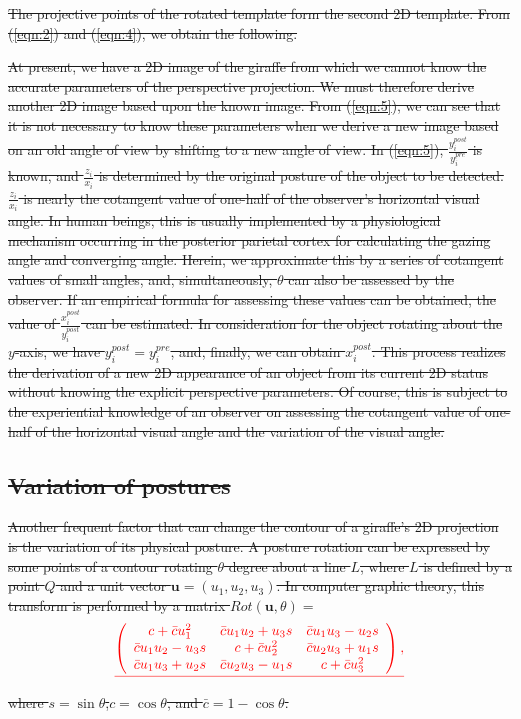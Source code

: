 \documentclass[journal]{IEEEtran}
\providecommand{\DIFdel}[1]{{\protect\color{red}\sout{#1}}}                      %
\begin{document}
\DIFdel{The projective points of the rotated template form the second 2D template.
From (\ref{eqn:2}) and (\ref{eqn:4}), we obtain the following.
}

\DIFdel{At present, 
we have a 2D image of the giraffe from which we cannot know the accurate parameters of the perspective projection. 
We must therefore derive another 2D image based upon the known image. 
From (\ref{eqn:5}), we can see that it is not necessary to know these parameters when we derive a new image based on an old angle of view by shifting to a new angle of view. 
In (\ref{eqn:5}), $\frac{y_i^{post}}{y_i^{pre}}$ is known,
and $\frac{z_i}{x_i}$ is determined by the original posture of the object to be detected. 
$\frac{z_i}{x_i}$ is nearly the cotangent value of one-half of the observer's horizontal visual angle. 
In human beings, this is usually implemented by a physiological mechanism occurring in the posterior parietal cortex for calculating the gazing angle and converging angle. 
Herein, we approximate this by a series of cotangent values of small angles, 
and, simultaneously, $\theta$ can also be assessed by the observer. 
If an empirical formula for assessing these values can be obtained, 
the value of $\frac{x_i^{post}}{y_i^{post}}$ can be estimated. 
In consideration for the object rotating about the $y$-axis, we have $y_i^{post}=y_i^{pre}$, 
and, finally, we can obtain $x_i^{post}$. 
This process realizes the derivation of a new 2D appearance of an object from its current 2D status without knowing the explicit perspective parameters. 
Of course, this is subject to the experiential knowledge of an observer on assessing the cotangent value of one-half of the horizontal visual angle and the variation of the visual angle.
}%

\subsection{\DIFdel{Variation of postures}}
\addtocounter{subsection}{-1}%

\DIFdel{Another frequent factor that can change the contour of a giraffe's 2D projection is the variation of its physical posture. 
A posture rotation can be expressed by some points of a contour rotating $\theta$ degree about a line $L$, 
where $L$ is defined by a point $Q$ and a unit vector $\mathbf{u}=(u_1,u_2,u_3)$. 
In computer graphic theory, this transform is performed by a matrix $Rot(\mathbf{u},\theta)=$
}\begin{displaymath}
\DIFdel{\left(
\begin{array}{ccc}
 c+\bar{c}u_1^2 
& \bar{c}u_1 u_2+u_3 s 
& \bar{c}u_1 u_3-u_2 s \\
 \bar{c}u_1 u_2-u_3 s 
& c+\bar{c}u_2^2 
& \bar{c}u_2 u_3+u_1 s \\
 \bar{c}u_1 u_3+u_2 s 
& \bar{c}u_2 u_3-u_1 s 
& c+\bar{c}u_3^2
\end{array}\right),
\label{eqn:6}
}\end{displaymath} 
\DIFdel{where $s=\sin\theta$,$c=\cos\theta$, and $\bar{c}=1-\cos\theta$.
}%
\end{document}
